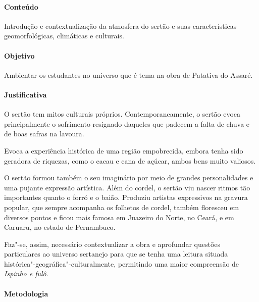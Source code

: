 \documentclass[12pt]{extarticle}
\begin{document}
\paragraph{Conteúdo} Introdução e contextualização da atmosfera do sertão 
e suas características geomorfológicas, climáticas e culturais. 

\paragraph{Objetivo} Ambientar os estudantes no universo que é tema na obra de
Patativa do Assaré.

\paragraph{Justificativa} O sertão tem mitos culturais próprios. 
Contemporaneamente, o sertão evoca principalmente o sofrimento resignado
daqueles que padecem a falta de chuva e de boas safras
na lavoura. 

Evoca a experiência histórica de uma região
empobrecida, embora tenha sido geradora de riquezas, como
o cacau e cana de açúcar, ambos bens muito valiosos.

O sertão formou também o seu imaginário por meio de
grandes personalidades e uma pujante expressão artística.
Além do cordel, o sertão viu nascer ritmos tão importantes
quanto o forró e o baião. Produziu artistas expressivos na 
gravura popular, que sempre acompanha os folhetos de cordel,
também floresceu em diversos pontos e ficou mais famosa
em Juazeiro do Norte, no Ceará, e em Caruaru, no estado
de Pernambuco.

Faz"-se, assim, necessário contextualizar a obra e aprofundar questões particulares ao universo 
sertanejo para que se tenha uma leitura situada histórica"-geográfica"-culturalmente, 
permitindo uma maior compreensão de \textit{Ispinho e fulô}. 

\paragraph{Metodologia}
\end{document}
